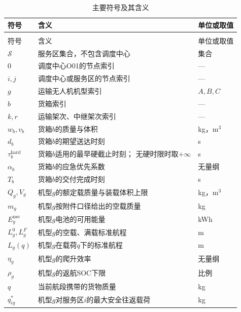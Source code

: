\documentclass[bwprint]{gmcmthesis}
\begin{document}
\renewcommand{\arraystretch}{1.18}
\begin{longtable}{
    >{\raggedright\arraybackslash}p{2.8cm}
    >{\raggedright\arraybackslash}p{8.4cm}
    >{\raggedright\arraybackslash}p{2cm}
}
    \caption{主要符号及其含义}
    \label{tab:notation}\\
    \toprule
    符号 & 含义 & 单位或取值 \\
    \midrule
    \endfirsthead

    \multicolumn{3}{c}{表~\thetable\quad 续表}\\
    \toprule
    符号 & 含义 & 单位或取值 \\
    \midrule
    \endhead

    \bottomrule
    \endfoot

    $\mathcal{S}$ & 服务区集合，不包含调度中心 & 集合 \\
    $0$ & 调度中心O01的节点索引 & --- \\
    $i,j$ & 调度中心或服务区的节点索引 & --- \\
    $g$ & 运输无人机机型索引 & $A,B,C$ \\
    $b$ & 货箱索引 & --- \\
    $k,r$ & 运输架次、中继架次索引 & --- \\

    $w_b,v_b$ & 货箱$b$的质量与体积 & kg，m$^3$ \\
    $d_b$ & 货箱$b$的期望送达时刻 & s \\
    $\tau_b^{\mathrm{hard}}$ &
    货箱$b$适用的最早硬截止时刻；
    无硬时限时取$+\infty$ & s \\
    $\alpha_b$ & 货箱$b$的应急优先系数 & 无量纲 \\
    $T_b$ & 货箱$b$的交付完成时刻 & s \\

    $Q_g,V_g$ & 机型$g$的额定载质量与装载体积上限 & kg，m$^3$ \\
    $m_g$ & 机型$g$按附件口径给出的空载质量 & kg \\
    $E_g^{\mathrm{use}}$ & 机型$g$电池的可用能量 & kWh \\
    $L_g^0,L_g^F$ & 机型$g$的空载、满载标准航程 & m \\
    $L_g(q)$ & 机型$g$在载荷$q$下的标准航程 & m \\
    $\eta_g$ & 机型$g$的爬升效率 & 无量纲 \\
    $\rho_g$ & 机型$g$的返航SOC下限 & 比例 \\
    $q$ & 当前航段携带的货物质量 & kg \\
    $q_{ig}^{*}$ & 机型$g$对服务区$i$的最大安全往返载荷 & kg \\


\end{longtable}
\end{document}
